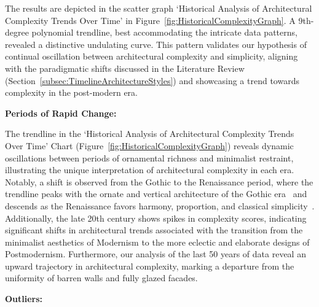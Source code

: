The results are depicted in the scatter graph `Historical Analysis of Architectural Complexity Trends Over Time' in Figure~\ref{fig:HistoricalComplexityGraph}.
A 9th-degree polynomial trendline, best accommodating the intricate data patterns, revealed a distinctive undulating curve.
This pattern validates our hypothesis of continual oscillation between architectural complexity and simplicity, aligning with the paradigmatic shifts discussed in the Literature Review (Section~\ref{subsec:TimelineArchitectureStyles}) and showcasing a trend towards complexity in the post-modern era.

\textbf{Periods of Rapid Change:}

The trendline in the `Historical Analysis of Architectural Complexity Trends Over Time' Chart (Figure~\ref{fig:HistoricalComplexityGraph}) reveals dynamic oscillations between periods of ornamental richness and minimalist restraint, illustrating the unique interpretation of architectural complexity in each era.
Notably, a shift is observed from the Gothic to the Renaissance period, where the trendline peaks with the ornate and vertical architecture of the Gothic era~\cite{Kennedy2013} and descends as the Renaissance favors harmony, proportion, and classical simplicity~\cite{Marder1990}.
Additionally, the late 20th century shows spikes in complexity scores, indicating significant shifts in architectural trends associated with the transition from the minimalist aesthetics of Modernism to the more eclectic and elaborate designs of Postmodernism.
Furthermore, our analysis of the last 50 years of data reveal an upward trajectory in architectural complexity, marking a departure from the uniformity of barren walls and fully glazed facades.

\textbf{Outliers:}

